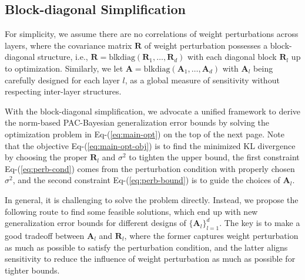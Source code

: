 \documentclass[journal]{IEEEtran} %
\def\eqref#1{Eq-(\ref{#1})}
\def\mA{{\bm{A}}}
\def\mR{{\bm{R}}}
\begin{document}
\subsection{Block-diagonal Simplification}
For simplicity, we assume there are no correlations of weight perturbations across layers, where the covariance matrix $\mR$ of weight perturbation possesses a block-diagonal structure, i.e., $\mR = \mathrm{blkdiag}(\mR_1, \dots, \mR_d)$ with each diagonal block $\mR_l$ up to optimization.
Similarly, we let $\mA = \mathrm{blkdiag}(\mA_1, \dots, \mA_d)$ with $\mA_l$ being carefully designed for each layer $l$, as a global measure of sensitivity without respecting inter-layer structures.




% 
With the block-diagonal simplification, we advocate a unified framework to derive the norm-based PAC-Bayesian generalization error bounds by solving the optimization problem in \eqref{eq:main-opt} on the top of the next page. Note that the objective \eqref{eq:main-opt-obj} is to find the minimized KL divergence by choosing the proper $\mR_l$ and $\sigma^2$ to tighten the upper bound, the first constraint \eqref{eq:perb-cond} comes from the perturbation condition with properly chosen $\sigma^2$, and the second constraint \eqref{eq:perb-bound} is to guide the choices of $\mA_l$.



In general, it is challenging to solve the problem directly. Instead, we propose the following route to find some feasible solutions, which end up with new generalization error bounds for different designs of $\{\mA_l\}_{l=1}^d$. The key is to make a good tradeoff between $\mA_l$ and $\mR_l$, where the former captures weight perturbation as much as possible to satisfy the perturbation condition, and the latter aligns sensitivity to reduce the influence of weight perturbation as much as possible for tighter bounds.
\end{document}
